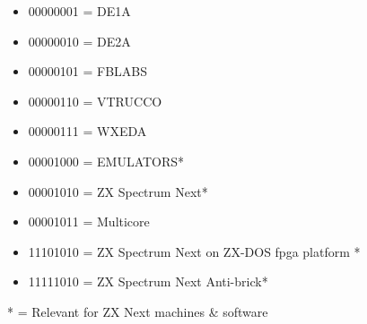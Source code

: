 \begin{itemize}
\item 00000001 = DE1A
\item 00000010 = DE2A
\item 00000101 = FBLABS
\item 00000110 = VTRUCCO
\item 00000111 = WXEDA
\item 00001000 = EMULATORS*
\item 00001010 = ZX Spectrum Next*
\item 00001011 = Multicore
\item 11101010 = ZX Spectrum Next on ZX-DOS fpga platform *
\item 11111010 = ZX Spectrum Next Anti-brick*
\end{itemize}
* = Relevant for ZX Next machines \& software
